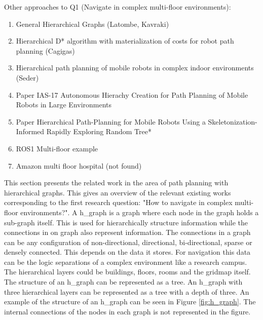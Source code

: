 Other approaches to Q1 (Navigate in complex multi-floor environments):
\begin{enumerate}
    \item General Hierarchical Graphs (Latombe, Kavraki)
    \item Hierarchical D* algorithm with materialization of costs for robot path planning (Cagigas)
    \item Hierarchical path planning of mobile robots in complex indoor environments (Seder)
    \item Paper IAS-17 Autonomous Hierachy Creation for Path Planning of Mobile Robots in Large Environments
    \item Paper Hierarchical Path-Planning for Mobile Robots Using a Skeletonization-Informed Rapidly Exploring Random Tree*
    \item ROS1 Multi-floor example
    \item Amazon multi floor hospital (not found)
\end{enumerate}

This section presents the related work in the area of path planning with hierarchical graphs. This gives an overview of the relevant existing works corresponding to the first research question: "How to navigate in complex multi-floor environments?". 
A \Gls{h_graph} is a graph where each node in the graph holds a sub-graph itself. This is used for hierarchically structure information while the connections in on graph also represent information. The connections in a graph can be any configuration of non-directional, directional, bi-directional, sparse or densely connected. This depends on the data it stores. For navigation this data can be the logic separations of a complex environment like a research campus. The hierarchical layers could be buildings, floors, rooms and the gridmap itself. The structure of an \gls{h_graph} can be represented as a tree. An \gls{h_graph} with three hierarchical layers can be represented as a tree with a depth of three. An example of the structure of an \gls{h_graph} can be seen in Figure \ref{fig:h_graph}. The internal connections of the nodes in each graph is not represented in the figure. 

